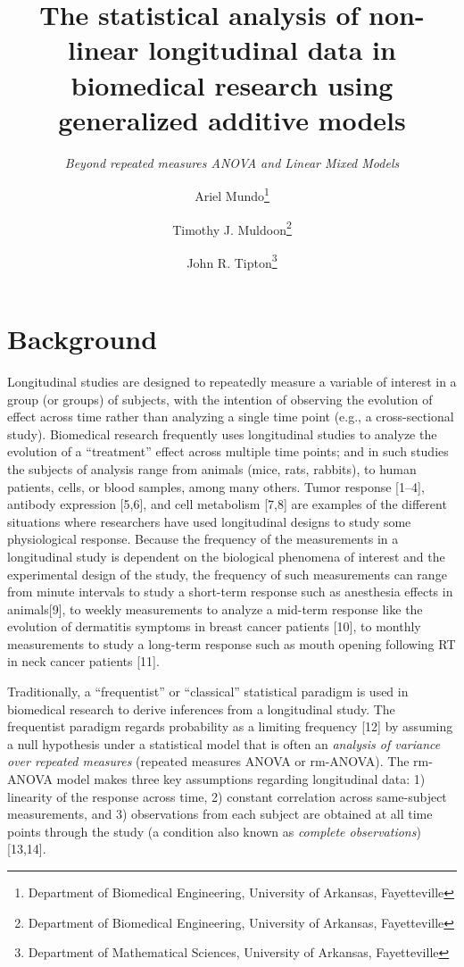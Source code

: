 \documentclass[
]{article}
\title{\textbf{The statistical analysis of non-linear longitudinal data in biomedical research using generalized additive models}}
\subtitle{\emph{Beyond repeated measures ANOVA and Linear Mixed Models}}
\author{Ariel Mundo\footnote{Department of Biomedical Engineering, University of Arkansas, Fayetteville} \and Timothy J. Muldoon\footnote{Department of Biomedical Engineering, University of Arkansas, Fayetteville} \and John R. Tipton\footnote{Department of Mathematical Sciences, University of Arkansas, Fayetteville}}
\date{}
\begin{document}
\maketitle

{
\setcounter{tocdepth}{2}
\tableofcontents
}
\hypertarget{background}{%
\section{Background}\label{background}}

Longitudinal studies are designed to repeatedly measure a variable of interest in a group (or groups) of subjects, with the intention of observing the evolution of effect across time rather than analyzing a single time point (e.g., a cross-sectional study). Biomedical research frequently uses longitudinal studies to analyze the evolution of a ``treatment'' effect across multiple time points; and in such studies the subjects of analysis range from animals (mice, rats, rabbits), to human patients, cells, or blood samples, among many others. Tumor response {[}1--4{]}, antibody expression {[}5,6{]}, and cell metabolism {[}7,8{]} are examples of the different situations where researchers have used longitudinal designs to study some physiological response. Because the frequency of the measurements in a longitudinal study is dependent on the biological phenomena of interest and the experimental design of the study, the frequency of such measurements can range from minute intervals to study a short-term response such as anesthesia effects in animals{[}9{]}, to weekly measurements to analyze a mid-term response like the evolution of dermatitis symptoms in breast cancer patients {[}10{]}, to monthly measurements to study a long-term response such as mouth opening following RT in neck cancer patients {[}11{]}.

Traditionally, a ``frequentist'' or ``classical'' statistical paradigm is used in biomedical research to derive inferences from a longitudinal study. The frequentist paradigm regards probability as a limiting frequency {[}12{]} by assuming a null hypothesis under a statistical model that is often an \emph{analysis of variance over repeated measures} (repeated measures ANOVA or rm-ANOVA). The rm-ANOVA model makes three key assumptions regarding longitudinal data: 1) linearity of the response across time, 2) constant correlation across same-subject measurements, and 3) observations from each subject are obtained at all time points through the study (a condition also known as \emph{complete observations}) {[}13,14{]}.
\end{document}
